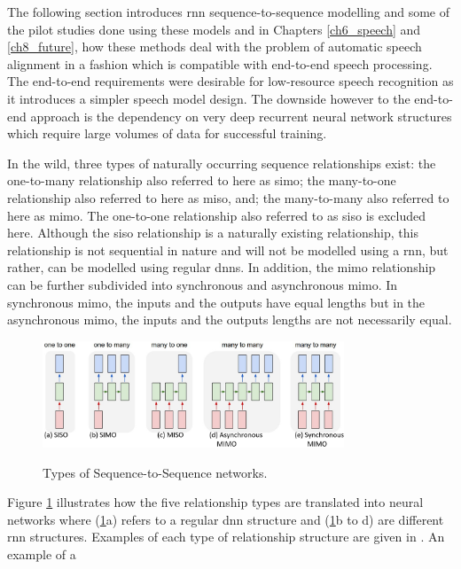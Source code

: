 The following section introduces \acrshort{rnn} sequence-to-sequence modelling and some of the pilot studies done using these models and in Chapters \ref{ch6_speech} and \ref{ch8_future}, how these methods deal with the problem of automatic speech alignment in a fashion which is compatible with end-to-end speech processing.  The end-to-end requirements were desirable for low-resource speech recognition as it introduces a simpler speech model design.  The downside however to the end-to-end approach is the dependency on very deep recurrent neural network structures which require large volumes of data for successful training.

In the wild, three types of naturally occurring sequence relationships exist: the one-to-many relationship also referred to here as \acrfull{simo}; the many-to-one relationship also referred to here as \acrfull{miso}, and; the many-to-many also referred to here as \acrfull{mimo}.  The one-to-one relationship also referred to as \acrfull{siso} is excluded here.  Although the \acrshort{siso} relationship is a naturally existing relationship, this relationship is not sequential in nature and will not be modelled using a \acrlong{rnn}, but rather, can be modelled using regular \acrlong{dnn}s.  In addition, the \acrshort{mimo} relationship can be further subdivided into synchronous and asynchronous \acrshort{mimo}. In synchronous \acrshort{mimo}, the inputs and the outputs have equal lengths but in the asynchronous \acrshort{mimo}, the inputs and the outputs lengths are not necessarily equal.

\begin{figure}
\centering
  \includegraphics[width=9cm]{thesis/images/seq03.PNG}\\
  \caption{Types of Sequence-to-Sequence networks.  \citep{karpathy2015unreasonable}}\label{fig_c3_seq2seq}
\end{figure}

Figure \ref{fig_c3_seq2seq} illustrates how the five  relationship types are translated into neural networks where (\ref{fig_c3_seq2seq}a) refers to a regular \acrshort{dnn} structure and (\ref{fig_c3_seq2seq}b to d) are different \acrshort{rnn} structures. Examples of each type of relationship structure are given in \cite{karpathy2015unreasonable}.  An example of a \
\stopblue

